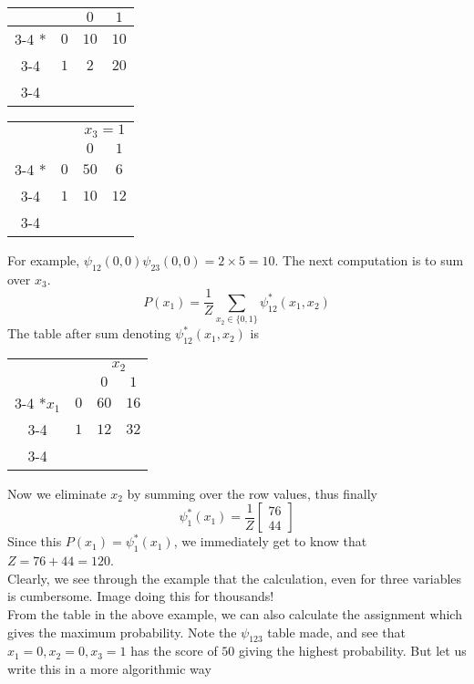 \begin{exmp}
\begin{center}
\begin{tabular}{cc|c|c|}
		& \multicolumn{1}{c}{} & \multicolumn{1}{c}{$0$}  & \multicolumn{1}{c}{$1$} \\\cline{3-4}
		\multirow{2}*{}  & $0$ & $10$ & $10	$ \\\cline{3-4}
		& $1$ & $2$ & $20$ \\\cline{3-4}
	\end{tabular}
	\qquad
	\begin{tabular}{cc|c|c|}
		& \multicolumn{1}{c}{} & \multicolumn{2}{c}{$x_3=1$}\\
		& \multicolumn{1}{c}{} & \multicolumn{1}{c}{$0$}  & \multicolumn{1}{c}{$1$} \\\cline{3-4}
		\multirow{2}*{}  & $0$ & $50$ & $6$ \\\cline{3-4}
		& $1$ & $10$ & $12$ \\\cline{3-4}
	\end{tabular}
\end{center}
For example, $\psi_{12}(0,0)\psi_{23}(0,0) = 2\times5=10$. The next computation is to sum over $x_3$.
\[P(x_1) = \dfrac{1}{Z} \sum_{x_2 \in \{0,1\}} \psi_{12}^*(x_1, x_2)\]
The table after sum denoting $\psi_{12}^*(x_1, x_2)$ is
\begin{center}
	\begin{tabular}{cc|c|c|}
		& \multicolumn{1}{c}{} & \multicolumn{2}{c}{$x_2$}\\
		& \multicolumn{1}{c}{} & \multicolumn{1}{c}{$0$}  & \multicolumn{1}{c}{$1$} \\\cline{3-4}
		\multirow{2}*{$x_1$}  & $0$ & $60$ & $16$ \\\cline{3-4}
		& $1$ & $12$ & $32$ \\\cline{3-4}
	\end{tabular}
\end{center}
Now we eliminate $x_2$ by summing over the row values, thus finally
\[
\psi_1^*(x_1) = \dfrac{1}{Z}\begin{bmatrix}
	76 \\ 44
\end{bmatrix}
\]
Since this $P(x_1) = \psi_1^*(x_1)$, we immediately get to know that $Z = 76+44 = 120$. \\
Clearly, we see through the example that the calculation, even for three variables is cumbersome. Image doing this for thousands! \\
From the table in the above example, we can also calculate the assignment which gives the maximum probability. Note the $\psi_{123}$ table made, and see that $x_1=0, x_2=0, x_3=1$ has the score of $50$ giving the highest probability. But let us write this in a more algorithmic way

\end{exmp}

